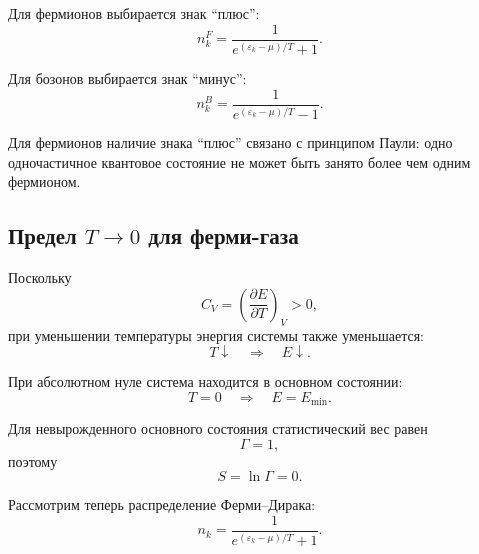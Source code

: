 \documentclass[../final.tex]{subfiles}
\begin{document}
Для фермионов выбирается знак ``плюс'':
%
\begin{equation*}
    \boxed{
        n_k^{F}
        =
        \frac{
            1
        }{
            e^{(\varepsilon_k-\mu)/T}+1
        }
    }.
\end{equation*}

Для бозонов выбирается знак ``минус'':
%
\begin{equation*}
    \boxed{
        n_k^{B}
        =
        \frac{
            1
        }{
            e^{(\varepsilon_k-\mu)/T}-1
        }
    }.
\end{equation*}

Для фермионов наличие знака ``плюс'' связано с принципом Паули:
одно одночастичное квантовое состояние не может быть занято
более чем одним фермионом.



\subsection*{Предел $T\to 0$ для ферми-газа}

Поскольку
%
\begin{equation*}
    C_V
    =
    \left(
        \frac{\partial E}{\partial T}
    \right)_V
    >0,
\end{equation*}
%
при уменьшении температуры энергия системы также уменьшается:
%
\begin{equation*}
    T\downarrow
    \quad\Longrightarrow\quad
    E\downarrow.
\end{equation*}

При абсолютном нуле система находится в основном состоянии:
%
\begin{equation*}
    T=0
    \quad\Longrightarrow\quad
    E=E_{\min}.
\end{equation*}

Для невырожденного основного состояния статистический вес равен
%
\begin{equation*}
    \Gamma=1,
\end{equation*}
%
поэтому
%
\begin{equation*}
    S
    =
    \ln\Gamma
    =
    0.
\end{equation*}


Рассмотрим теперь распределение Ферми--Дирака:
%
\begin{equation*}
    n_k
    =
    \frac{
        1
    }{
        e^{(\varepsilon_k-\mu)/T}+1
    }.
\end{equation*}
\end{document}
